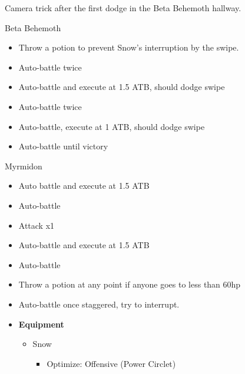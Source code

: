 \documentclass{report}
\begin{document}
Camera trick after the first dodge in the Beta Behemoth hallway.

\begin{battle}{Beta Behemoth}
\begin{itemize}
    \item Throw a potion to prevent Snow's interruption by the swipe.
    \item Auto-battle twice
    \item Auto-battle and execute at 1.5 ATB, should dodge swipe
    \item Auto-battle twice
    \item Auto-battle, execute at 1 ATB, should dodge swipe
    \item Auto-battle until victory
\end{itemize}
\end{battle}


\begin{battle}{Myrmidon}
\begin{itemize}
    \item Auto battle and execute at 1.5 ATB
    \item Auto-battle
    \item Attack x1
    \item Auto-battle and execute at 1.5 ATB
    \item Auto-battle
    \item Throw a potion at any point if anyone goes to less than 60hp
    \item Auto-battle once staggered, try to interrupt.
\end{itemize}

\end{battle}


\begin{menu}
\begin{itemize}
    \item \textbf{Equipment}
    \begin{itemize}
        \item Snow
        \begin{itemize}
            \item Optimize: Offensive (Power Circlet)
        \end{itemize}
    \end{itemize}
\end{itemize}
\end{menu}
\end{document}
